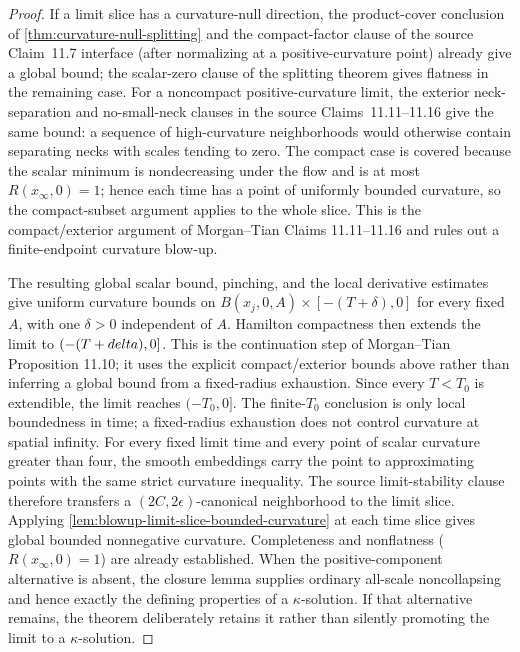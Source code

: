 \begin{proof}
If a limit slice has a curvature-null direction, the product-cover conclusion
of \ref{thm:curvature-null-splitting} and the compact-factor clause of the
source Claim~11.7 interface (after normalizing at a positive-curvature point)
already give a global bound; the scalar-zero clause of the splitting theorem
gives flatness in the remaining case.  For a noncompact positive-curvature
limit, the exterior neck-separation and no-small-neck clauses in the source
Claims~11.11--11.16 give the same bound: a sequence of high-curvature
neighborhoods would otherwise contain separating necks with scales tending to
zero.  The compact case is covered because the scalar
minimum is nondecreasing under the flow and is at most
$R(x_\infty,0)=1$; hence each time has a point of uniformly bounded
curvature, so the compact-subset argument applies to the whole slice.  This
is the compact/exterior argument of Morgan--Tian Claims 11.11--11.16 and
rules out a finite-endpoint curvature blow-up.

The resulting global scalar bound, pinching, and the local derivative
estimates give uniform curvature bounds on
$B(x_j,0,A)\times[-(T+\delta),0]$ for every fixed $A$, with one
$\delta>0$ independent of $A$.  Hamilton compactness then extends the
limit to $(-(T+\\delta),0]$.  This is the continuation step of Morgan--Tian
Proposition 11.10; it uses the explicit compact/exterior bounds above rather
than inferring a global bound from a fixed-radius exhaustion.  Since every
$T<T_0$ is extendible, the limit reaches $(-T_0,0]$.
The finite-$T_0$ conclusion is only local boundedness in time; a fixed-radius
exhaustion does not control curvature at spatial infinity.  For every fixed
  limit time and every point of scalar curvature greater than four, the smooth
embeddings carry the point to approximating points with the same strict
curvature inequality.  The source limit-stability clause therefore transfers
a $(2C,2\epsilon)$-canonical neighborhood to the limit slice.  Applying
\ref{lem:blowup-limit-slice-bounded-curvature} at each time slice gives global
bounded nonnegative curvature.  Completeness and nonflatness
($R(x_\infty,0)=1$) are already established.  When the positive-component
alternative is absent, the closure lemma supplies ordinary all-scale
noncollapsing and hence exactly the defining properties of a $\kappa$-solution.
If that alternative remains, the theorem deliberately retains it rather than
silently promoting the limit to a $\kappa$-solution.
\end{proof}
